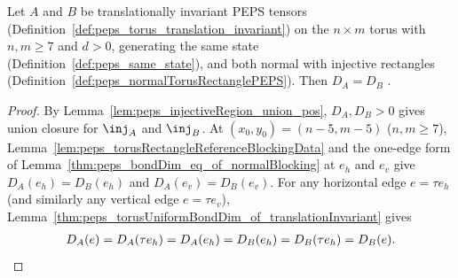 \begin{lemma}%
    \label{thm:peps_bondDim_eq_of_normalTorusRectangularInjectivity}
    \leanok
    Let $A$ and $B$ be translationally invariant PEPS tensors
    (Definition~\ref{def:peps_torus_translation_invariant}) on the $n\times m$
    torus with $n,m\ge 7$ and $d>0$, generating the same state
    (Definition~\ref{def:peps_same_state}), and both normal with injective
    rectangles (Definition~\ref{def:peps_normalTorusRectanglePEPS}). Then
    $D_A=D_B$ \cite[Section~3, Lemma \emph{inj\_isomorph}, lines~560--583 and
        1407--1500]{Molnar2018NormalPEPS}.
    \begin{proof}
        \leanok
        By Lemma~\ref{lem:peps_injectiveRegion_union_pos}, $D_A,D_B>0$ gives
        union closure for $\inj_A$ and $\inj_B$. At $(x_0,y_0)=(n-5,m-5)$
        ($n,m\ge 7$), Lemma~\ref{lem:peps_torusRectangleReferenceBlockingData}
        and the one-edge form of Lemma~\ref{thm:peps_bondDim_eq_of_normalBlocking}
        at $e_h$ and $e_v$ give $D_A(e_h)=D_B(e_h)$ and $D_A(e_v)=D_B(e_v)$.
        For any horizontal edge $e=\tau e_h$ (and similarly any vertical edge
        $e=\tau e_v$), Lemma~\ref{thm:peps_torusUniformBondDim_of_translationInvariant}
        gives
        \begin{align}
            D_A(e)=D_A(\tau e_h)=D_A(e_h)=D_B(e_h)=D_B(\tau e_h)=D_B(e).
            \notag
        \end{align}
    \end{proof}
\end{lemma}

